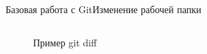 \begin{frame}{Базовая работа с Git}{Изменение рабочей папки}
\begin{columns}
\begin{column}{0.4\textwidth}
\begin{figure}
                \caption{Пример git diff}
            \end{figure}
        \end{column}
    \end{columns}

\end{frame}